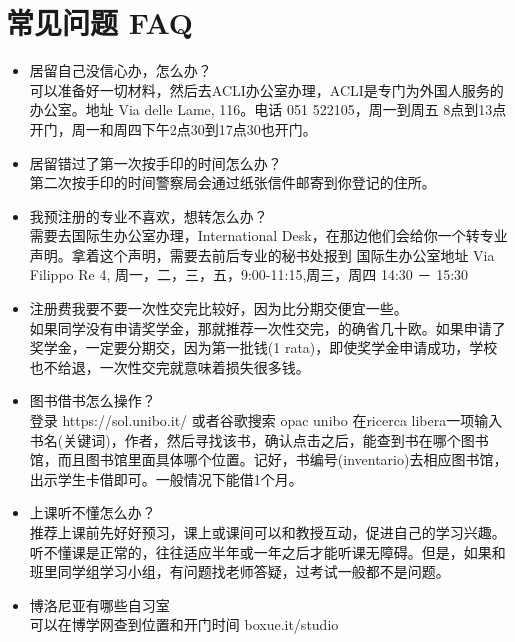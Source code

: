 \chapter{常见问题 FAQ}              

\begin{itemize}


\item 居留自己没信心办，怎么办？\\
可以准备好一切材料，然后去ACLI办公室办理，ACLI是专门为外国人服务的办公室。地址 Via delle Lame, 116。电话 051 522105，周一到周五 8点到13点开门，周一和周四下午2点30到17点30也开门。

\item 居留错过了第一次按手印的时间怎么办？\\
第二次按手印的时间警察局会通过纸张信件邮寄到你登记的住所。


\item 我预注册的专业不喜欢，想转怎么办？\\
需要去国际生办公室办理，International Desk，在那边他们会给你一个转专业声明。拿着这个声明，需要去前后专业的秘书处报到
国际生办公室地址 Via Filippo Re 4, 周一，二，三，五，9:00-11:15,周三，周四 14:30 － 15:30

\item 注册费我要不要一次性交完比较好，因为比分期交便宜一些。\\
如果同学没有申请奖学金，那就推荐一次性交完，的确省几十欧。如果申请了奖学金，一定要分期交，因为第一批钱(1 rata)，即使奖学金申请成功，学校也不给退，一次性交完就意味着损失很多钱。


\item 图书借书怎么操作？\\
登录 https://sol.unibo.it/ 或者谷歌搜索 opac unibo
在ricerca libera一项输入书名(关键词)，作者，然后寻找该书，确认点击之后，能查到书在哪个图书馆，而且图书馆里面具体哪个位置。记好，书编号(inventario)去相应图书馆，出示学生卡借即可。一般情况下能借1个月。

\item 上课听不懂怎么办？\\
推荐上课前先好好预习，课上或课间可以和教授互动，促进自己的学习兴趣。听不懂课是正常的，往往适应半年或一年之后才能听课无障碍。但是，如果和班里同学组学习小组，有问题找老师答疑，过考试一般都不是问题。

\item 博洛尼亚有哪些自习室\\
可以在博学网查到位置和开门时间
boxue.it/studio 
\end{itemize} 
